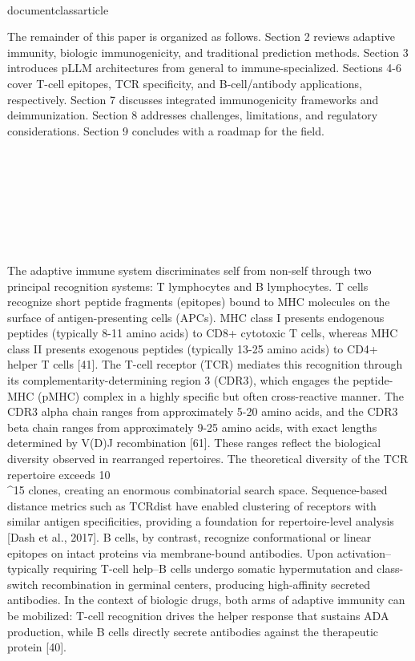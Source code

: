 \\documentclass{article}
\begin{document}
The remainder of this paper is organized as follows. Section 2 reviews adaptive immunity, biologic immunogenicity, and traditional prediction methods. Section 3 introduces pLLM architectures from general to immune-specialized. Sections 4-6 cover T-cell epitopes, TCR specificity, and B-cell/antibody applications, respectively. Section 7 discusses integrated immunogenicity frameworks and deimmunization. Section 8 addresses challenges, limitations, and regulatory considerations. Section 9 concludes with a roadmap for the field.

\section{}

\subsection{}

The adaptive immune system discriminates self from non-self through two principal recognition systems: T lymphocytes and B lymphocytes. T cells recognize short peptide fragments (epitopes) bound to MHC molecules on the surface of antigen-presenting cells (APCs). MHC class I presents endogenous peptides (typically 8-11 amino acids) to CD8+ cytotoxic T cells, whereas MHC class II presents exogenous peptides (typically 13-25 amino acids) to CD4+ helper T cells [41]. The T-cell receptor (TCR) mediates this recognition through its complementarity-determining region 3 (CDR3), which engages the peptide-MHC (pMHC) complex in a highly specific but often cross-reactive manner. The CDR3 alpha chain ranges from approximately 5-20 amino acids, and the CDR3 beta chain ranges from approximately 9-25 amino acids, with exact lengths determined by V(D)J recombination [61]. These ranges reflect the biological diversity observed in rearranged repertoires. The theoretical diversity of the TCR repertoire exceeds 10\\^15 clones, creating an enormous combinatorial search space. Sequence-based distance metrics such as TCRdist have enabled clustering of receptors with similar antigen specificities, providing a foundation for repertoire-level analysis [Dash et al., 2017]. B cells, by contrast, recognize conformational or linear epitopes on intact proteins via membrane-bound antibodies. Upon activation--typically requiring T-cell help--B cells undergo somatic hypermutation and class-switch recombination in germinal centers, producing high-affinity secreted antibodies. In the context of biologic drugs, both arms of adaptive immunity can be mobilized: T-cell recognition drives the helper response that sustains ADA production, while B cells directly secrete antibodies against the therapeutic protein [40].
\end{document}
